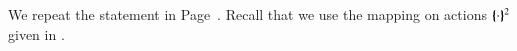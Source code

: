 


We repeat the statement in Page~\pageref{prop:op_corr_HOp_to_p}. 
Recall that we use the mapping on actions $\{\!\!\{\cdot\}\!\!\}^{2}$ given in .

\begin{proposition}\myrm
	\label{app:prop:op_corr_HOp_to_p}

\end{proposition}


